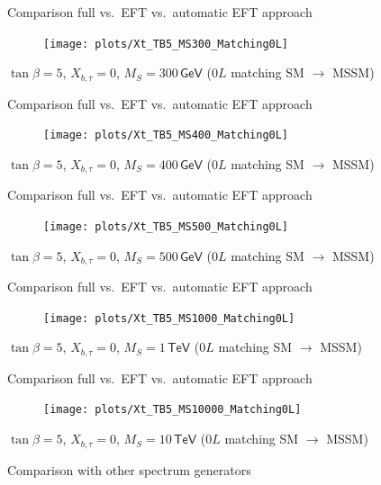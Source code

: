 \documentclass[hyperref={pdfpagelabels=false},ngerman]{beamer}
\newcommand{\eh}[1]{\,\mathsf{#1}}
\begin{document}
\begin{frame}[noframenumbering]{Comparison full vs.\ EFT vs.\ automatic EFT approach}
  \begin{figure}
    \centering
    \texttt{[image: plots/Xt\_TB5\_MS300\_Matching0L]}
  \end{figure}
  $\tan\beta = 5$, $X_{b,\tau} = 0$, $M_S = 300\eh{GeV}$ ($0L$ matching SM $\rightarrow$ MSSM)
\end{frame}

\begin{frame}[noframenumbering]{Comparison full vs.\ EFT vs.\ automatic EFT approach}
  \begin{figure}
    \centering
    \texttt{[image: plots/Xt\_TB5\_MS400\_Matching0L]}
  \end{figure}
  $\tan\beta = 5$, $X_{b,\tau} = 0$, $M_S = 400\eh{GeV}$ ($0L$ matching SM $\rightarrow$ MSSM)
\end{frame}

\begin{frame}[noframenumbering]{Comparison full vs.\ EFT vs.\ automatic EFT approach}
  \begin{figure}
    \centering
    \texttt{[image: plots/Xt\_TB5\_MS500\_Matching0L]}
  \end{figure}
  $\tan\beta = 5$, $X_{b,\tau} = 0$, $M_S = 500\eh{GeV}$ ($0L$ matching SM $\rightarrow$ MSSM)
\end{frame}

\begin{frame}[noframenumbering]{Comparison full vs.\ EFT vs.\ automatic EFT approach}
  \begin{figure}
    \centering
    \texttt{[image: plots/Xt\_TB5\_MS1000\_Matching0L]}
  \end{figure}
  $\tan\beta = 5$, $X_{b,\tau} = 0$, $M_S = 1\eh{TeV}$ ($0L$ matching SM $\rightarrow$ MSSM)
\end{frame}

\begin{frame}[noframenumbering]{Comparison full vs.\ EFT vs.\ automatic EFT approach}
  \begin{figure}
    \centering
    \texttt{[image: plots/Xt\_TB5\_MS10000\_Matching0L]}
  \end{figure}
  $\tan\beta = 5$, $X_{b,\tau} = 0$, $M_S = 10\eh{TeV}$ ($0L$ matching SM $\rightarrow$ MSSM)
\end{frame}

\begin{frame}[noframenumbering]
  \begin{center}
    \Large Comparison with other spectrum generators
  \end{center}
\end{frame}
\end{document}
